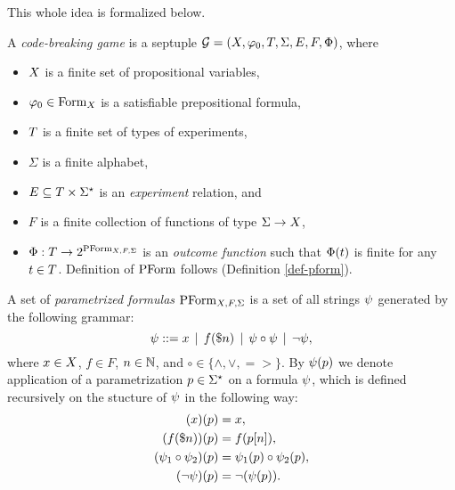 
This whole idea is formalized below.

\begin{definition} \label{def-game}
A \emph{code-breaking game} is a septuple
  $\mathcal{G} = (X, \varphi_0, T, \Sigma, E, F, \Phi)$, where
  \begin{itemize}
  \item $X$ is a finite set of propositional variables,
  \item $\varphi_0 \in \textrm{Form}_X$ is a satisfiable prepositional formula,
  \item $T$ is a finite set of types of experiments,
  \item $\Sigma$ is a finite alphabet,
  \item $E \subseteq T \times \Sigma^\star$ is an \emph{experiment} relation,
  and
  \item $F$ is a finite collection of functions of type $\Sigma -> X$,
  \item $\Phi: T -> 2^{\textrm{PForm}_{X,F,\Sigma}}$ is an
  \emph{outcome function} such that $\Phi(t)$ is finite
  for any $t\in T$. Definition of $\textrm{PForm}$ follows (Definition \ref{def-pform}).
  \end{itemize}
\end{definition}

\begin{definition} \label{def-pform}
A set of \emph{parametrized formulas} $\textrm{PForm}_{X,F,\Sigma}$ is a set of
 all strings $\psi$ generated by the following grammar:
$$ \psi ::= x \:\:|\:\: f(\$n) \:\:|\:\: \psi \circ \psi \:\:|\:\: \neg \psi,$$
where $x\in X$, $f\in F$, $n \in\mathbb{N}$, and $\circ\in\{\wedge, \vee, =>\}$.
By $\psi(p)$ we denote application of a parametrization $p\in\Sigma^\star$
on a formula $\psi$, which is defined recursively on the stucture of $\psi$ in the following way:
\begin{align}
(x)(p) &= x, \\
(f(\$n))(p) &= f(p[n]),\\
(\psi_1\circ\psi_2)(p) &= \psi_1(p) \circ \psi_2(p),\\
(\neg\psi)(p) &= \neg(\psi(p)).
\end{align}
\end{definition}

